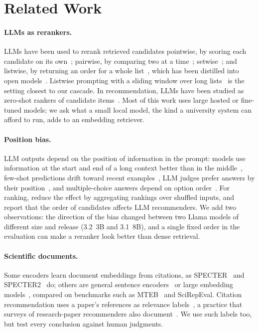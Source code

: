 \documentclass[sigconf,nonacm]{acmart}
\begin{document}
\section{Related Work}
\label{sec:related}
\paragraph{LLMs as rerankers.}
LLMs have been used to rerank retrieved candidates pointwise, by scoring each candidate on its own~\citep{sachan2022upr}; pairwise, by comparing two at a time~\citep{qin2024prp}; setwise~\citep{zhuang2024setwise}; and listwise, by returning an order for a whole list~\citep{sun2023rankgpt,ma2023lrl}, which has been distilled into open models~\citep{pradeep2023rankvicuna,pradeep2023rankzephyr}.
Listwise prompting with a sliding window over long lists~\citep{sun2023rankgpt} is the setting closest to our cascade.
In recommendation, LLMs have been studied as zero-shot rankers of candidate items~\citep{hou2024llmrank,dai2023chatgptrec}.
Most of this work uses large hosted or fine-tuned models; we ask what a small local model, the kind a university system can afford to run, adds to an embedding retriever.

\paragraph{Position bias.}
LLM outputs depend on the position of information in the prompt: models use information at the start and end of a long context better than in the middle~\citep{liu2024lost}, few-shot predictions drift toward recent examples~\citep{zhao2021calibrate}, LLM judges prefer answers by their position~\citep{zheng2023judging,wang2024fair}, and multiple-choice answers depend on option order~\citep{pezeshkpour2024order,zheng2024selectors}.
For ranking, \citet{tang2024found} reduce the effect by aggregating rankings over shuffled inputs, and \citet{hou2024llmrank} report that the order of candidates affects LLM recommenders.
We add two observations: the direction of the bias changed between two Llama models of different size and release (3.2~3B and 3.1~8B), and a single fixed order in the evaluation can make a reranker look better than dense retrieval.

\paragraph{Scientific documents.}
Some encoders learn document embeddings from citations, as SPECTER~\citep{cohan2020specter} and SPECTER2~\citep{singh2023scirepeval} do; others are general sentence encoders~\citep{reimers2019sbert,wang2020minilm} or large embedding models~\citep{zhang2025qwen3embedding,vera2025embeddinggemma}, compared on benchmarks such as MTEB~\citep{muennighoff2023mteb} and SciRepEval.
Citation recommendation uses a paper's references as relevance labels~\citep{bhagavatula2018citeomatic,farber2020citation}, a practice that surveys of research-paper recommenders also document~\citep{beel2016survey}.
We use such labels too, but test every conclusion against human judgments.
\end{document}
